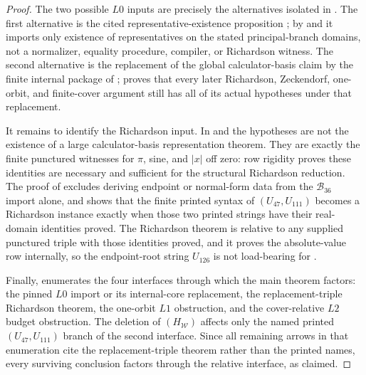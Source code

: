 \begin{proof}
The two possible \(L0\) inputs are precisely the alternatives isolated in
.  The first alternative is the cited
representative-existence proposition ; by
 and 
it imports only existence of representatives on the stated principal-branch
domains, not a normalizer, equality procedure, compiler, or Richardson witness.
The second alternative is the replacement of the global calculator-basis claim by
the finite internal package of ;
 proves that every later
Richardson, Zeckendorf, one-orbit, and finite-cover argument still has all of its
actual hypotheses under that replacement.

It remains to identify the Richardson input.  In
 and
 the hypotheses are not the
existence of a large calculator-basis representation theorem.  They are exactly
the finite punctured witnesses for \(\pi\), sine, and \(|x|\) off zero: row
rigidity proves these identities are necessary and sufficient for the structural
Richardson reduction.  The proof
of  excludes deriving endpoint or normal-form
data from the \(\mathcal B_{36}\) import alone, and
shows that the finite printed syntax of \((U_{47},U_{111})\) becomes a
Richardson instance exactly when those two printed strings have their
real-domain identities proved.  The Richardson theorem is relative to any
supplied punctured triple with those identities proved, and it proves the
absolute-value row internally, so the endpoint-root string \(U_{126}\) is not
load-bearing for .

Finally,  enumerates the four
interfaces through which the main theorem factors: the pinned \(L0\) import or
its internal-core replacement, the replacement-triple Richardson theorem, the
one-orbit \(L1\) obstruction, and the cover-relative \(L2\) budget obstruction.
The deletion of \((H_{\mathcal W})\) affects only the named printed
\((U_{47},U_{111})\) branch of the second interface.  Since all remaining
arrows in that enumeration cite the replacement-triple theorem rather than the
printed names, every surviving conclusion factors through the relative
interface, as claimed.
\end{proof}

